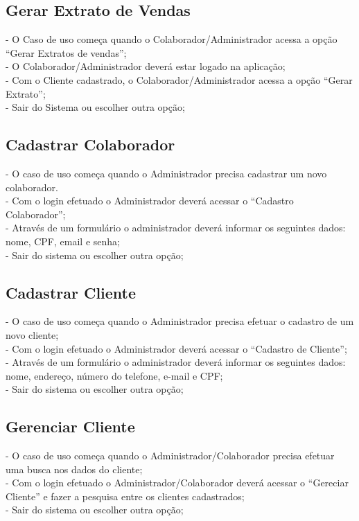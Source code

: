 \documentclass[a4paper]{article}
\begin{document}
    \subsection{Gerar Extrato de Vendas}
    - O Caso de uso começa quando o Colaborador/Administrador acessa a opção “Gerar Extratos de vendas”;\\
    - O Colaborador/Administrador deverá estar logado na aplicação;\\
    - Com o Cliente cadastrado, o Colaborador/Administrador acessa a opção “Gerar Extrato”;\\
    - Sair do Sistema ou escolher outra opção;\\
    
    \subsection{Cadastrar Colaborador}
    - O caso de uso começa quando o Administrador precisa cadastrar um novo colaborador.\\
    - Com o login efetuado o Administrador deverá acessar o “Cadastro Colaborador”;\\
    - Através de um formulário o administrador deverá informar os seguintes dados:
    nome, CPF, email e senha;\\
    - Sair do sistema ou escolher outra opção;\\

    \subsection{Cadastrar Cliente}
    - O caso de uso começa quando o Administrador precisa efetuar o cadastro de um novo cliente;\\
    - Com o login efetuado o Administrador deverá acessar o “Cadastro de Cliente”;\\
    - Através de um formulário o administrador deverá informar os seguintes dados:\\
    nome, endereço, número do telefone, e-mail e CPF;\\
    - Sair do sistema ou escolher outra opção;\\

   \subsection{Gerenciar Cliente}
    - O caso de uso começa quando o Administrador/Colaborador precisa efetuar uma
    busca nos dados do cliente;\\
    - Com o login efetuado o Administrador/Colaborador deverá acessar o “Gereciar
    Cliente” e fazer a pesquisa entre os clientes cadastrados;\\
    - Sair do sistema ou escolher outra opção;\\
\end{document}
